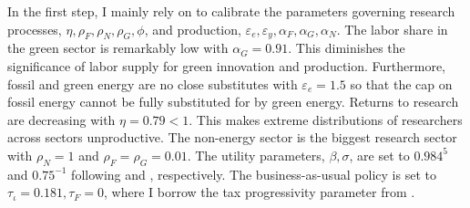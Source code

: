 In the first step, I mainly rely on \cite{Fried2018ClimateAnalysis} to calibrate the parameters governing research processes, $\eta, \rho_F,\rho_N, \rho_G, \phi $, and production, $\varepsilon_e, \varepsilon_y, \alpha_F, \alpha_G, \alpha_N$. The labor share in the green sector is remarkably low with $\alpha_G=0.91$. This diminishes the significance of labor supply for green innovation and production. Furthermore, fossil and green energy are no close substitutes with $\varepsilon_e=1.5$ so that the cap on fossil energy cannot be fully substituted for by green energy.
Returns to research are decreasing with $\eta=0.79<1$. This makes extreme distributions of researchers across sectors unproductive. The non-energy sector is the biggest research sector with $\rho_N=1$ and $\rho_F=\rho_G=0.01$. 
 The utility parameters, $\beta, \sigma$, are set to $0.984^5$ and $0.75^{-1}$ following \cite{Barrage2019OptimalPolicy} and \cite{Chetty2011AreMargins}, respectively. The business-as-usual policy is set to $\tau_\iota=0.181, \tau_F=0$, where I borrow the tax progressivity parameter from \cite{Heathcote2017OptimalFramework}. 

